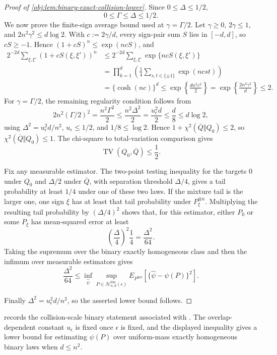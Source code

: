 \documentclass[11pt]{article}
\begin{document}
\begin{proof}[Proof of \cref{obj:lem:binary-exact-collision-lower}]
Since \(0\le\Delta\le1/2\),
\[
0\le\Gamma\le\Delta\le1/2.
\]
We now prove the finite-sign average bound used at \(\gamma=\Gamma/2\).  Let \(\gamma\ge0\), \(2\gamma\le1\), and \(2n^2\gamma^2\le d\log2\).  With \(c:=2\gamma/d\), every sign-pair sum \(S\) lies in \([-d,d]\), so \(cS\ge-1\).  Hence \((1+cS)^n\le \exp(ncS)\), and
\[
\begin{aligned}
2^{-2d}\sum_{\xi,\xi'}(1+cS(\xi,\xi'))^n
&\le
2^{-2d}\sum_{\xi,\xi'}\exp\{ncS(\xi,\xi')\} \\
&=
\prod_{k=1}^d\left(\frac14\sum_{s,t\in\{\pm1\}}\exp(ncst)\right) \\
&=\{\cosh(nc)\}^d
\le \exp\left\{\frac{d n^2c^2}{2}\right\}
=\exp\left\{\frac{2n^2\gamma^2}{d}\right\}
\le 2.
\end{aligned}
\]
For \(\gamma=\Gamma/2\), the remaining regularity condition follows from
\[
2n^2(\Gamma/2)^2
=\frac{n^2\Gamma^2}{2}
\le \frac{n^2\Delta^2}{2}
=\frac{u_\epsilon^2d}{2}
\le \frac d8
\le d\log2,
\]
using \(\Delta^2=u_\epsilon^2d/n^2\), \(u_\epsilon\le1/2\), and \(1/8\le\log2\).  Hence \(1+\chi^2(\overline Q\Vert Q_0)\le2\), so \(\chi^2(\overline Q\Vert Q_0)\le1\).  The chi-square to total-variation comparison gives
\[
\operatorname{TV}(Q_0,\overline Q)\le\frac12 .
\] %

Fix any measurable estimator.  The two-point testing inequality for the targets \(0\) under \(Q_0\) and \(\Delta/2\) under \(\overline Q\), with separation threshold \(\Delta/4\), gives a tail probability at least \(1/4\) under one of these two laws.  If the mixture tail is the larger one, one sign \(\xi\) has at least that tail probability under \(P_\xi^{\otimes n}\).  Multiplying the resulting tail probability by \((\Delta/4)^2\) shows that, for this estimator, either \(P_0\) or some \(P_\xi\) has mean-squared error at least
\[
\left(\frac{\Delta}{4}\right)^2\frac14
=\frac{\Delta^2}{64}.
\]
Taking the supremum over the binary exactly homogeneous class and then the infimum over measurable estimators gives
\[
\frac{\Delta^2}{64}
\le
\inf_{\widehat\psi}\sup_{P\in\mathcal H_{n,d}^{\mathrm{bin}}(\epsilon)}
E_{P^{\otimes n}}\!\left[\{\widehat\psi-\psi(P)\}^2\right].
\] %

Finally \(\Delta^2=u_\epsilon^2d/n^2\), so the asserted lower bound follows.
\end{proof}

 records the collision-scale binary statement associated with \citet{ZengBalakrishnanHanKennedy2024}. The overlap-dependent constant \(u_{\epsilon}\) is fixed once \(\epsilon\) is fixed, and the displayed inequality gives a lower bound for estimating \(\psi(P)\) over uniform-mass exactly homogeneous binary laws when \(d\le n^2\).
\end{document}

